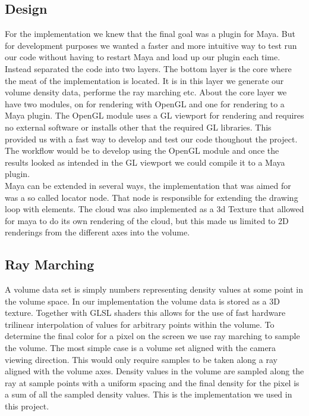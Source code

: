 \documentclass[11pt,twocolumn]{article}
\begin{document}
\subsection{Design}
For the implementation we knew that the final goal was a plugin for Maya.
But for development purposes we wanted a faster and more intuitive way to test run our code without having to restart Maya and load up our plugin each time.
Instead separated the code into two layers. The bottom layer is the core where the meat of the implementation is located. It is in this layer we generate our volume density data, performe the ray marching etc. About the core layer we have two modules, on for rendering with OpenGL and one for rendering to a Maya plugin. The OpenGL module uses a GL viewport for rendering and requires no external software or installs other that the required GL libraries. This provided us with a fast way to develop and test our code thoughout the project. The workflow would be to develop using the OpenGL module and once the results looked as intended in the GL viewport we could compile it to a Maya plugin.
\\

Maya can be extended in several ways, the implementation that was aimed for was a so called locator node.
That node is responsible for extending the drawing loop with elements.
The cloud was also implemented as a 3d Texture that allowed for maya to do its own rendering of the cloud, but this made us limited to 2D renderings from the different axes into the volume.

\subsection{Ray Marching}
A volume data set is simply numbers representing density values at some point in the volume space.
In our implementation the volume data is stored as a 3D texture.
Together with GLSL shaders this allows for the use of fast hardware trilinear interpolation of values for arbitrary points within the volume. To determine the final color for a pixel on the screen we use ray marching to sample the volume.
The most simple case is a volume set aligned with the camera viewing direction.
This would only require samples to be taken along a ray aligned with the volume axes.
Density values in the volume are sampled along the ray at sample points with a uniform spacing and the final density for the pixel is a sum of all the sampled density values.
This is the implementation we used in this project.
\\
\end{document}

